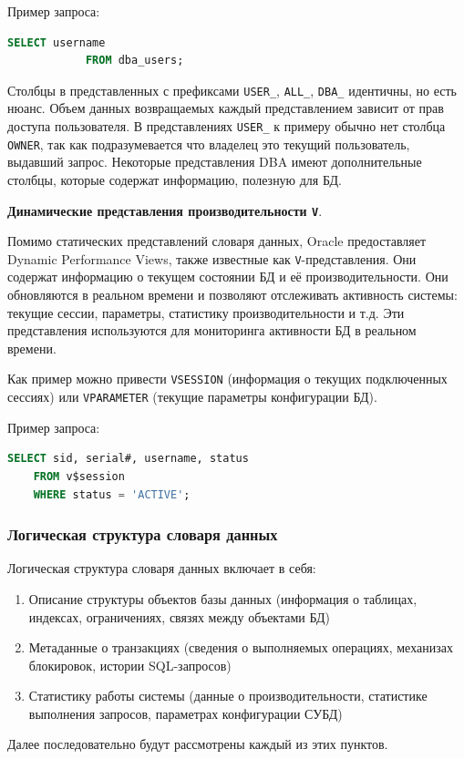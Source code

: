 \begin{enumerate}
\begin{enumerate}
        Пример запроса:
        \begin{lstlisting}[language=SQL]
            SELECT username 
            FROM dba_users;
        \end{lstlisting}

    \end{enumerate}

    Столбцы в представленных с префиксами \texttt{USER\_}, \texttt{ALL\_}, \texttt{DBA\_} идентичны, но есть нюанс. Объем данных возвращаемых каждый представлением зависит от прав доступа пользователя. В представлениях \texttt{USER\_} к примеру обычно нет столбца \texttt{OWNER}, так как подразумевается что владелец это текущий пользователь, выдавший запрос. Некоторые представления DBA имеют дополнительные столбцы, которые содержат информацию, полезную для БД.

    \textbf{Динамические представления производительности \texttt{V\textdollar}}. \autocite{oracledbdoc2}

    Помимо статических представлений словаря данных, Oracle предоставляет Dynamic Performance Views, также известные как \texttt{V\textdollar}-представления. Они содержат информацию о текущем состоянии БД и её производительности. Они обновляются в реальном времени и позволяют отслеживать активность системы: текущие сессии, параметры, статистику производительности и т.д. Эти представления используются для мониторинга активности БД в реальном времени.

    Как пример можно привести \texttt{V\textdollar SESSION} (информация о текущих подключенных сессиях) или \texttt{V\textdollar PARAMETER} (текущие параметры конфигурации БД).

    Пример запроса:
    \begin{lstlisting}[language=SQL]
    SELECT sid, serial#, username, status 
    FROM v$session 
    WHERE status = 'ACTIVE';
    \end{lstlisting}
    
\end{enumerate}

\subsubsection{Логическая структура словаря данных}

Логическая структура словаря данных \autocite{PostgreSQLdocc51,ElmasriNavathe,Silberschatz} включает в себя:

\begin{enumerate}
    \item Описание структуры объектов базы данных (информация о таблицах, индексах, ограничениях, связях между объектами БД)
    \item Метаданные о транзакциях (сведения о выполняемых операциях, механизах блокировок, истории SQL-запросов)
    \item Статистику работы системы (данные о производительности, статистике выполнения запросов, параметрах конфигурации СУБД)
\end{enumerate}
Далее последовательно будут рассмотрены каждый из этих пунктов.

